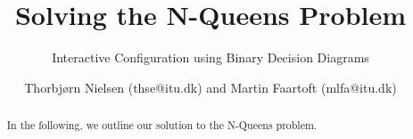 \documentclass{llncs}
\begin{document}
\title{Solving the N-Queens Problem}
\subtitle{Interactive Configuration using Binary Decision Diagrams}
\author{Thorbjørn Nielsen (thse@itu.dk) and Martin Faartoft (mlfa@itu.dk)}
\maketitle
\begin{abstract}
In the following, we outline our solution to the N-Queens problem.
\end{abstract}
\end{document}
